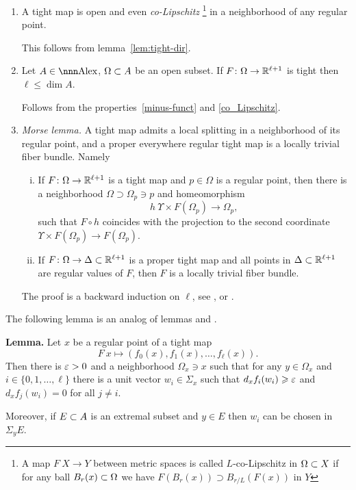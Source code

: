 \documentclass{article}
\begin{document}
\begin{enumerate}
\item\label{co_Lipschitz} 
A tight map is open and even \emph{co-Lipschitz}%
\footnote{A map $F\: X\to Y$ between
metric spaces is called $L$-co-Lipschitz in $\Omega\subset X$ if for any ball $B_r(x)\subset
\Omega$ we have $F(B_r(x))\supset B_{r/L}(F(x))$ in $Y$} 
in a neighborhood of any regular point.

This follows from lemma~\ref{lem:tight-dir}.

\item Let $A\in\Alex$, $\Omega\subset A$ be an open subset.
If $F\colon\Omega\to\mathbb{R}^{\ell+1}$ is tight then $\ell\le\dim A$.

Follows from the properties~\ref{minus-funct} and \ref{co_Lipschitz}.

\item{\it Morse lemma.}\label{morse} A tight map admits a local splitting in a neighborhood of its regular point, and a proper everywhere regular tight map is a locally trivial fiber bundle. Namely

\begin{enumerate}[(i)]
\item If $F\colon\Omega\to\mathbb{R}^{\ell+1}$ is a tight map and $p\in \Omega$ is a regular point, then there is a neighborhood $\Omega\supset\Omega_p\ni p$ and homeomorphism 
$$h\:\Upsilon\times F(\Omega_p)\to \Omega_p,$$ 
such that
$F\circ h$ coincides with the projection to the second coordinate $\Upsilon\times F(\Omega_p)\to F(\Omega_p)$.
\item If $F\colon\Omega\to\Delta\subset\mathbb{R}^{\ell+1}$ is a proper tight map and all points in $\Delta\z\i \RR^{\ell+1}$ are regular values of $F$, then $F$ is a locally trivial fiber bundle.
\end{enumerate}
The proof is a backward induction on $\ell$, see 
\cite[1.4]{perelman:morse}, \cite[1.4.1]{perelman:spaces2} or
\cite[6.7]{kapovitch:stability}.
\end{enumerate}

The following lemma is an analog of lemmas 
\cite[2.3]{perelman:morse} and \cite[2.2]{perelman:DC}.

\begin{thm}{\bf Lemma.}\label{lem:tight-dir} Let $x$ be a regular point of a tight
map $$F\:x\mapsto(f_0(x),f_1(x),\dots,f_\ell(x)).$$
Then there is $\varepsilon>0$ and a neighborhood $\Omega_x\ni x$ such that for any
$y\in \Omega_x$ and $i\in\{0,1,\dots,\ell\}$ there is a unit vector $w_i\in \Sigma_x$
such that $d_x f_i(w_i)\geqslant\varepsilon$ and $d_x f_j(w_i)=0$ for all $j\not=i$. 

Moreover, if $E\subset A$ is an extremal subset and $y\in E$ then $w_i$ can be
chosen in $\Sigma_y E$.

\end{thm}
\end{document}
